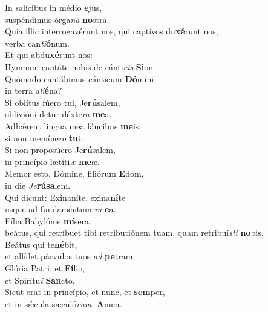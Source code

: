 \evenverse In salícibus in médio \textbf{e}jus,~\*\\
\evenverse suspéndimus órga\textit{na} \textbf{no}stra.\\
\oddverse Quia illic interrogavérunt nos, qui captívos du\textbf{xé}runt nos,~\*\\
\oddverse verba can\textit{ti}\textbf{ó}num.\\
\evenverse Et qui abdu\textbf{xé}runt nos:~\*\\
\evenverse Hymnum cantáte nobis de cánti\textit{cis} \textbf{Si}on.\\
\oddverse Quómodo cantábimus cánticum \textbf{Dó}mini~\*\\
\oddverse in terra a\textit{li}\textbf{é}na?\\
\evenverse Si oblítus fúero tui, Je\textbf{rú}salem,~\*\\
\evenverse oblivióni detur déxte\textit{ra} \textbf{me}a.\\
\oddverse Adhǽreat lingua mea fáucibus \textbf{me}is,~\*\\
\oddverse si non memíne\textit{ro} \textbf{tu}i.\\
\evenverse Si non proposúero Je\textbf{rú}salem,~\*\\
\evenverse in princípio lætíti\textit{æ} \textbf{me}æ.\\
\oddverse Memor esto, Dómine, filiórum \textbf{E}dom,~\*\\
\oddverse in die \textit{Je}\textbf{rú}\textbf{sa}lem.\\
\evenverse Qui dicunt: Exinaníte, exina\textbf{ní}te~\*\\
\evenverse usque ad fundaméntum \textit{in} \textbf{e}a.\\
\oddverse Fília Babylónis \textbf{mí}sera:~\*\\
\oddverse beátus, qui retríbuet tibi retributiónem tuam, quam retribuí\textit{sti} \textbf{no}bis.\\
\evenverse Beátus qui te\textbf{né}bit,~\*\\
\evenverse et allídet párvulos tuos \textit{ad} \textbf{pe}tram.\\
\oddverse Glória Patri, et \textbf{Fí}lio,~\*\\
\oddverse et Spirítu\textit{i} \textbf{San}cto.\\
\evenverse Sicut erat in princípio, et nunc, et \textbf{sem}per,~\*\\
\evenverse et in sǽcula sæculó\textit{rum}. \textbf{A}men.\\
